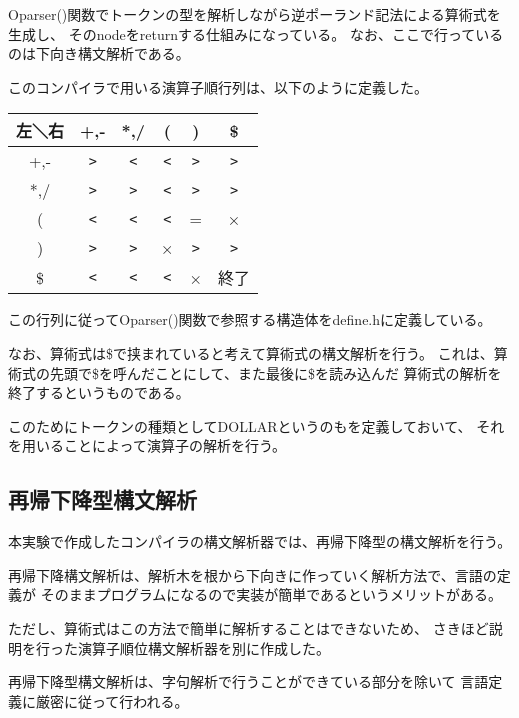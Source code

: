 \documentclass[11pt,a4j]{jarticle}
\begin{document}
Oparser()関数でトークンの型を解析しながら逆ポーランド記法による算術式を生成し、
そのnodeをreturnする仕組みになっている。
なお、ここで行っているのは下向き構文解析である。

\vspace{0.2in}

このコンパイラで用いる演算子順行列は、以下のように定義した。

\begin{table}[h]
\centering
\begin{tabular}{|c|c|c|c|c|c|}\hline
左＼右 & +,- & *,/ & ( & ) & \$\\ \hline
+,- & \verb|>| & \verb|<| & \verb|<| & \verb|>| & \verb|>| \\ \hline
*,/ & \verb|>| & \verb|>| & \verb|<| & \verb|>| & \verb|>| \\ \hline
( & \verb|<| & \verb|<| & \verb|<| & = & × \\ \hline
) & \verb|>| & \verb|>| & × & \verb|>| & \verb|>| \\ \hline
\$ & \verb|<| & \verb|<| & \verb|<| & × & 終了 \\ \hline
\end{tabular}
\end{table}

この行列に従ってOparser()関数で参照する構造体をdefine.hに定義している。


なお、算術式は\$で挟まれていると考えて算術式の構文解析を行う。
これは、算術式の先頭で\$を呼んだことにして、また最後に\$を読み込んだ
算術式の解析を終了するというものである。　

このためにトークンの種類としてDOLLARというのもを定義しておいて、
それを用いることによって演算子の解析を行う。



\subsection{再帰下降型構文解析}

本実験で作成したコンパイラの構文解析器では、再帰下降型の構文解析を行う。

再帰下降構文解析は、解析木を根から下向きに作っていく解析方法で、言語の定義が
そのままプログラムになるので実装が簡単であるというメリットがある。

ただし、算術式はこの方法で簡単に解析することはできないため、
さきほど説明を行った演算子順位構文解析器を別に作成した。

再帰下降型構文解析は、字句解析で行うことができている部分を除いて
言語定義に厳密に従って行われる。
\end{document}
